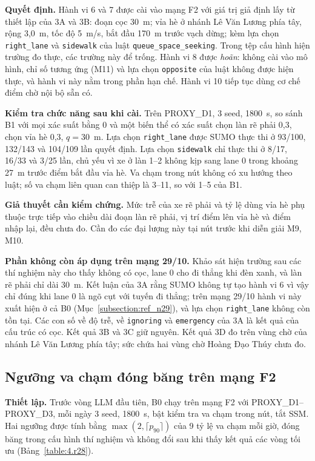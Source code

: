 \documentclass[../main.tex]{subfiles}
\begin{document}
\textbf{Quyết định.} Hành vi 6 và 7 được cài vào mạng F2 với giá trị giả định lấy từ thiết lập của 3A và 3B: đoạn cọc 30~m; vỉa hè ở nhánh Lê Văn Lương phía tây, rộng 3,0~m, tốc độ 5~m/s, bắt đầu 170~m trước vạch dừng; kèm lựa chọn \texttt{right\_lane} và \texttt{sidewalk} của luật \texttt{queue\_space\_seeking}. Trong tệp cấu hình hiện trường đo thực, các trường này để trống. Hành vi 8 được \emph{hoãn}: không cài vào mô hình, chỉ số tương ứng (M11) và lựa chọn \texttt{opposite} của luật không được hiện thực, và hành vi này nằm trong phần hạn chế. Hành vi 10 tiếp tục dùng cơ chế điểm chờ nội bộ sẵn có.

\textbf{Kiểm tra chức năng sau khi cài.} Trên PROXY\_D1, 3 seed, 1800~s, so sánh B1 với mọi xác suất bằng 0 và một biến thể có xác suất chọn làn rẽ phải 0,3, chọn vỉa hè 0,3, $q = 30$~m. Lựa chọn \texttt{right\_lane} được SUMO thực thi ở 93/100, 132/143 và 104/109 lần quyết định. Lựa chọn \texttt{sidewalk} chỉ thực thi ở 8/17, 16/33 và 3/25 lần, chủ yếu vì xe ở làn 1--2 không kịp sang lane 0 trong khoảng 27~m trước điểm bắt đầu vỉa hè. Va chạm trong nút không có xu hướng theo luật; số va chạm liên quan can thiệp là 3--11, so với 1--5 của B1.

\textbf{Giả thuyết cần kiểm chứng.} Mức trễ của xe rẽ phải và tỷ lệ dùng vỉa hè phụ thuộc trực tiếp vào chiều dài đoạn làn rẽ phải, vị trí điểm lên vỉa hè và điểm nhập lại, đều chưa đo. Cần đo các đại lượng này tại nút trước khi diễn giải M9, M10.

\textbf{Phần không còn áp dụng trên mạng 29/10.} Khảo sát hiện trường sau các thí nghiệm này cho thấy không có cọc, lane 0 cho đi thẳng khi đèn xanh, và làn rẽ phải chỉ dài 30~m. Kết luận của 3A rằng SUMO không tự tạo hành vi 6 vì vậy chỉ đúng khi lane 0 là ngõ cụt với tuyến đi thẳng; trên mạng 29/10 hành vi này xuất hiện ở cả B0 (Mục~\ref{subsection:ref_n29}), và lựa chọn \texttt{right\_lane} không còn tồn tại. Các con số về độ trễ, về \texttt{ignoring} và \texttt{emergency} của 3A là kết quả của cấu trúc có cọc. Kết quả 3B và 3C giữ nguyên. Kết quả 3D đo trên vùng chờ của nhánh Lê Văn Lương phía tây; sức chứa hai vùng chờ Hoàng Đạo Thúy chưa đo.

\subsection{Ngưỡng va chạm đóng băng trên mạng F2}
\label{subsection:r28_f2}

\textbf{Thiết lập.} Trước vòng LLM đầu tiên, B0 chạy trên mạng F2 với PROXY\_D1--PROXY\_D3, mỗi ngày 3 seed, 1800~s, bật kiểm tra va chạm trong nút, tắt SSM. Hai ngưỡng được tính bằng $\max(2, \lceil p_{90} \rceil)$ của 9 tỷ lệ va chạm mỗi giờ, đóng băng trong cấu hình thí nghiệm và không đổi sau khi thấy kết quả các vòng tối ưu (Bảng~\ref{table:4.r28}).
\end{document}
